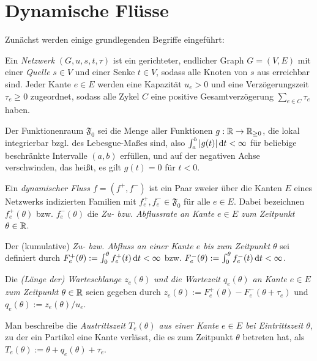 \section{Dynamische Flüsse}\label{sec-dynamic-flows}

Zunächst werden einige grundlegenden Begriffe eingeführt:

\begin{definition}[Netzwerk]
	Ein \emph{Netzwerk} $(G, u, s, t, \tau)$ ist ein gerichteter, endlicher Graph $G=(V,E)$ mit einer \emph{Quelle} $s\in V$ und einer Senke $t\in V$, sodass alle Knoten von $s$ aus erreichbar sind.
	Jeder Kante $e\in E$ werden eine Kapazität $u_e > 0$ und eine Verzögerungszeit $\tau_e\geq 0$ zugeordnet, sodass alle Zykel $C$ eine positive Gesamtverzögerung $\sum_{e\in C}\tau_e$ haben.
\end{definition}

\begin{definition}
	Der Funktionenraum $\mathfrak{F}_0$ sei die Menge aller Funktionen $g: \mathbb{R} \to \mathbb{R}_{\geq 0}$, die lokal integrierbar bzgl. des Lebesgue-Maßes sind, also $\int_a^b |g(t)| \mathop{}\!\mathrm{d} t< \infty$ für beliebige beschränkte Intervalle $(a,b)$ erfüllen, und auf der negativen Achse verschwinden, das heißt, es gilt $g(t)=0$ für $t<0$.
\end{definition}

\begin{definition}
	Ein \emph{dynamischer Fluss $f=(f^+, f^-)$} ist ein Paar zweier über die Kanten $E$ eines Netzwerks indizierten Familien mit $f^+_e,f^-_e\in\mathfrak F_0$ für alle $e\in E$.
	Dabei bezeichnen $f_e^+(\theta)$ bzw. $f_e^-(\theta)$ die \emph{Zu- bzw. Abflussrate an Kante $e\in E$ zum Zeitpunkt $\theta\in\mathbb{R}$}.
	
	Der (kumulative) \emph{Zu- bzw. Abfluss an einer Kante $e$ bis zum Zeitpunkt $\theta$} sei definiert durch $F^+_e(\theta):=\int_0^\theta f^+_e(t) \mathop{}\!\mathrm{d} t<\infty$ bzw. $F^-_e(\theta):=\int_0^\theta f^-_e(t) \mathop{}\!\mathrm{d} t<\infty$.
	
	Die \emph{(Länge der) Warteschlange $z_e(\theta)$ und die Wartezeit $q_e(\theta)$ an Kante $e\in E$ zum Zeitpunkt $\theta\in\mathbb{R}$} seien gegeben durch $z_e(\theta):= F_e^+(\theta) - F_e^-(\theta + \tau_e)$ und $q_e(\theta) := z_e(\theta) / u_e$.
	
	Man beschreibe die \emph{Austrittszeit $T_e(\theta)$ aus einer Kante $e\in E$ bei Eintrittszeit $\theta$}, zu der ein Partikel eine Kante verlässt, die es zum Zeitpunkt $\theta$ betreten hat, als $T_e(\theta):=\theta + q_e(\theta) + \tau_e$.
\end{definition}

